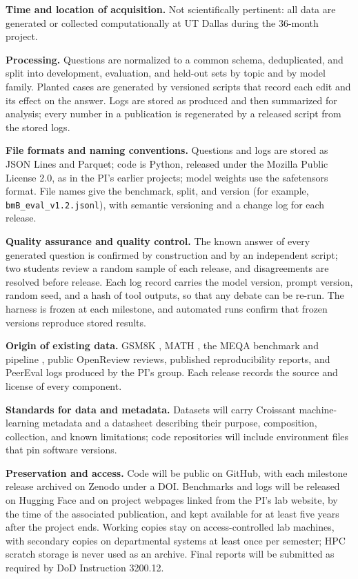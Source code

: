 \documentclass[12pt,letterpaper]{article}
\newcommand{\hd}[1]{\ifhmode\par\fi\addvspace{1pt}\noindent\textbf{#1}\hspace{0.35em}}
\begin{document}
\hd{Time and location of acquisition.} Not scientifically pertinent: all data are generated or collected computationally at UT Dallas during the 36-month project.

\hd{Processing.} Questions are normalized to a common schema, deduplicated, and split into development, evaluation, and held-out sets by topic and by model family. Planted cases are generated by versioned scripts that record each edit and its effect on the answer. Logs are stored as produced and then summarized for analysis; every number in a publication is regenerated by a released script from the stored logs.

\hd{File formats and naming conventions.} Questions and logs are stored as JSON Lines and Parquet; code is Python, released under the Mozilla Public License 2.0, as in the PI's earlier projects; model weights use the safetensors format. File names give the benchmark, split, and version (for example, \texttt{bmB\_eval\_v1.2.jsonl}), with semantic versioning and a change log for each release.

\hd{Quality assurance and quality control.} The known answer of every generated question is confirmed by construction and by an independent script; two students review a random sample of each release, and disagreements are resolved before release. Each log record carries the model version, prompt version, random seed, and a hash of tool outputs, so that any debate can be re-run. The harness is frozen at each milestone, and automated runs confirm that frozen versions reproduce stored results.

\hd{Origin of existing data.} GSM8K \citep{cobbe2021gsm8k}, MATH \citep{hendrycks2021math}, the MEQA benchmark and pipeline \citep{li2024meqa}, public OpenReview reviews, published reproducibility reports, and PeerEval logs produced by the PI's group. Each release records the source and license of every component.

\hd{Standards for data and metadata.} Datasets will carry Croissant machine-learning metadata and a datasheet describing their purpose, composition, collection, and known limitations; code repositories will include environment files that pin software versions.

\hd{Preservation and access.} Code will be public on GitHub, with each milestone release archived on Zenodo under a DOI. Benchmarks and logs will be released on Hugging Face and on project webpages linked from the PI's lab website, by the time of the associated publication, and kept available for at least five years after the project ends. Working copies stay on access-controlled lab machines, with secondary copies on departmental systems at least once per semester; HPC scratch storage is never used as an archive. Final reports will be submitted as required by DoD Instruction 3200.12.
\end{document}
